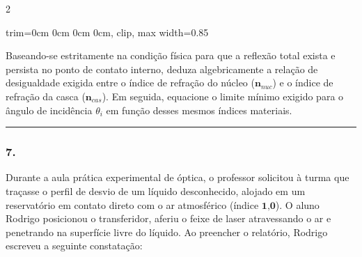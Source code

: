 \documentclass[twoside, 10pt, a4paper]{article}
\newlength{\espacoPreQuestao}\setlength{\espacoPreQuestao}{0.1cm}
\newlength{\espacoQuestao}\setlength{\espacoQuestao}{0.2cm}
\newcommand{\larguraTikz}{0.85\linewidth}
\begin{document}
\begin{multicols*}{2}
\begin{center}
\begin{adjustbox}{trim=0cm 0cm 0cm 0cm, clip, max width=\larguraTikz}
\end{adjustbox}
\end{center}
Baseando-se estritamente na condição física para que a reflexão total exista e persista no ponto de contato interno, deduza algebricamente a relação de desigualdade exigida entre o índice de refração do núcleo ($ \textbf{n}_{nuc} $) e o índice de refração da casca ($ \textbf{n}_{cas} $). Em seguida, equacione o limite mínimo exigido para o ângulo de incidência $ \theta_i $ em função desses mesmos índices materiais.
\par\vspace{\espacoQuestao}

\noindent\textcolor{CorLinha}{\rule{\linewidth}{0.5pt}} 
\par\vspace{\espacoPreQuestao}
\subsubsection*{7.} Durante a aula prática experimental de óptica, o professor solicitou à turma que traçasse o perfil de desvio de um líquido desconhecido, alojado em um reservatório em contato direto com o ar atmosférico (índice $ \textbf{1,0} $). O aluno Rodrigo posicionou o transferidor, aferiu o feixe de laser atravessando o ar e penetrando na superfície livre do líquido. Ao preencher o relatório, Rodrigo escreveu a seguinte constatação:


\end{multicols*}
\end{document}
